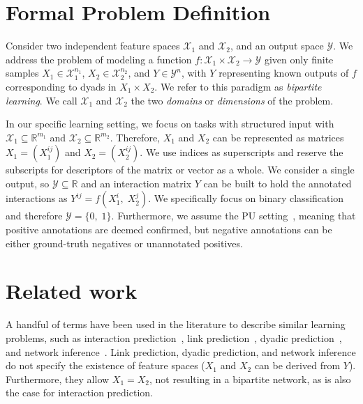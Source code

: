 \documentclass[letterpaper]{article}
\newcommand{\X}{\mathcal{X}}
\newcommand{\Y}{\mathcal{Y}}
\newcommand{\R}{\mathbb{R}}
\begin{document}
\section{Formal Problem Definition}
\label{sec:background}


Consider two independent feature spaces $\X_1$ and $\X_2$, and an output space $\Y$.
We address the problem of modeling a function $f \colon \X_1 \times \X_2 \to \Y$ given only finite samples $X_1 \in \X_1^{n_1}$, $X_2 \in \X_2^{n_2}$, and $Y\in \Y^n$, with $Y$ representing known outputs of $f$ corresponding to dyads in $X_1 \times X_2$.
We refer to this paradigm as \emph{bipartite learning}.
We call $\X_1$ and $\X_2$ the two \emph{domains} or \emph{dimensions} of the problem.

In our specific learning setting, we focus on tasks with structured input with $\X_1 \subseteq \R^{m_1}$ and $\X_2 \subseteq \R^{m_2}$. Therefore, $X_1$ and $X_2$ can be represented as matrices $X_1=(X_1^{ij})$ and $X_2=(X_2^{ij})$. We use indices as superscripts and reserve the subscripts for descriptors of the matrix or vector as a whole.
We consider a single output, so $\Y \subseteq \R$ and an interaction matrix $Y$ can be built to hold the annotated interactions as $Y^{ij} = f(X_1^i,\; X_2^j)$.
We specifically focus on binary classification and therefore $\Y=\{0,\;1\}$. Furthermore, we assume the PU setting~\cite{bekker2020learning}, meaning that positive annotations are deemed confirmed, but negative annotations can be either ground-truth negatives or unannotated positives.


\section{Related work}
\label{sec:related work}

A handful of terms have been used in the literature to describe similar learning problems,
such as interaction prediction~\cite{schrynemackers_classifying_2015,pliakos_network_2019,chen_machine_2018,bagherian_machine_2020}, link prediction~\cite{lu_link_2011,zhou_progresses_2021}, dyadic prediction~\cite{menon_log-linear_2010,pahikkala_two-step_2014,jin_multitask_2017}, and network inference~\cite{park_flaws_2012,pahikkala_toward_2015,schrynemackers_protocols_2013,pliakos_network_2019}.
Link prediction, dyadic prediction, and network inference do not specify the existence of feature spaces ($X_1$ and $X_2$ can be derived from $Y$). Furthermore, they allow $X_1 = X_2$, not resulting in a bipartite network, as is also the case for interaction prediction.
\end{document}
